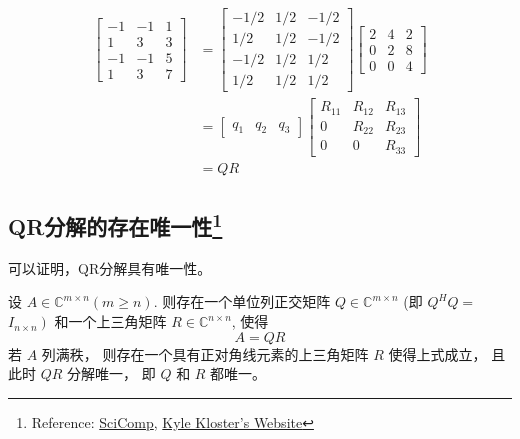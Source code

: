 \begin{example}
    \begin{equation}
\begin{aligned}
\left[\begin{array}{rrr}
-1 & -1 & 1 \\
1 & 3 & 3 \\
-1 & -1 & 5 \\
1 & 3 & 7
\end{array}\right] &=\left[\begin{array}{rrr}
-1 / 2 & 1 / 2 & -1 / 2 \\
1 / 2 & 1 / 2 & -1 / 2 \\
-1 / 2 & 1 / 2 & 1 / 2 \\
1 / 2 & 1 / 2 & 1 / 2
\end{array}\right]\left[\begin{array}{rrr}
2 & 4 & 2 \\
0 & 2 & 8 \\
0 & 0 & 4
\end{array}\right] \\
&=\left[\begin{array}{lll}
q_{1} & q_{2} & q_{3}
\end{array}\right]\left[\begin{array}{ccc}
R_{11} & R_{12} & R_{13} \\
0 & R_{22} & R_{23} \\
0 & 0 & R_{33}
\end{array}\right] \\
&=Q R
\end{aligned}
\end{equation}
\end{example}

\subsection[QR分解的存在唯一性]{QR分解的存在唯一性\footnote{Reference: \href{http://math.ecnu.edu.cn/~jypan/Teaching/SciComp/}{SciComp}, \href{https://www.math.purdue.edu/~kkloste/cs515fa14/qr-uniqueness.pdf}{Kyle Kloster's Website}}}

可以证明，QR分解具有唯一性。


\begin{theorem}

    设 $A \in \mathbb{C}^{m \times n}(m \geq n)$. 则存在一个单位列正交矩阵 $Q \in \mathbb{C}^{m \times n}$ (即 $Q^{H} Q=$ $\left.I_{n \times n}\right)$ 和一个上三角矩阵 $R \in \mathbb{C}^{n \times n}$, 使得
\begin{equation}
A=Q R
\end{equation}
若 $A$ 列满秩， 则存在一个具有正对角线元素的上三角矩阵 $R$ 使得上式成立， 且此时 $Q R$ 分解唯一， 即 $Q$ 和 $R$ 都唯一。
\end{theorem}

